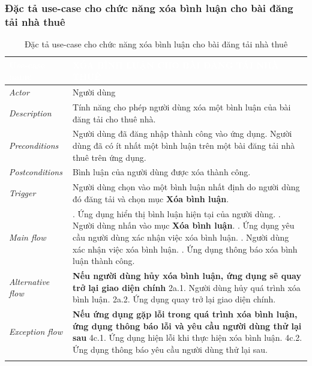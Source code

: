 \subsubsection{Đặc tả use-case cho chức năng xóa bình luận cho bài đăng tải nhà thuê}
\begin{center}
    \arrayrulewidth=2pt
    \begin{longtable}{
        |>{\raggedright\arraybackslash}p{3cm}
        |>{\raggedright\arraybackslash}p{13cm}
        |}
        \hline
        \rowcolor{cyan!75!black} \textcolor{white}{\textbf{Use-case name}} & \textcolor{white}{\textbf{XÓA BÌNH LUẬN CHO BÀI ĐĂNG TẢI NHÀ THUÊ}}
        \\\hline
        \rowcolor{cyan!10!white} \textit{Actor} & Người dùng
        \\\hdashline
        \rowcolor{cyan!10!white} \textit{Description} & Tính năng cho phép người dùng xóa một bình luận của bài đăng tải cho thuê nhà.
        \\\hdashline
        \rowcolor{cyan!10!white} \textit{Preconditions} & Người dùng đã đăng nhập thành công vào ứng dụng. Người dùng đã có ít nhất một bình luận trên một bài đăng tải nhà thuê trên ứng dụng.
        \\\hdashline
        \rowcolor{cyan!10!white} \textit{Postconditions} & Bình luận của người dùng được xóa thành công.
        \\\hdashline
        \rowcolor{cyan!10!white} \textit{Trigger} & Người dùng chọn vào một bình luận nhất định do người dùng đó đăng tải và chọn mục \textbf{Xóa bình luận}.
        \\\hdashline
        \rowcolor{cyan!10!white} \textit{Main flow} &
        1. Ứng dụng hiển thị bình luận hiện tại của người dùng. \newline
        3. Người dùng nhấn vào mục \textbf{Xóa bình luận}. \newline
        4. Ứng dụng yêu cầu người dùng xác nhận việc xóa bình luận. \newline
        5. Người dùng xác nhận việc xóa bình luận. \newline
        6. Ứng dụng thông báo xóa bình luận thành công.
        \\\hdashline
        \rowcolor{cyan!10!white} \textit{Alternative flow} & 
        \textbf{Nếu người dùng hủy xóa bình luận, ứng dụng sẽ quay trở lại giao diện chính} \newline
        2a.1. Người dùng hủy quá trình xóa bình luận. \newline
        2a.2. Ứng dụng quay trở lại giao diện chính.
        \\\hdashline
        \rowcolor{cyan!10!white} \textit{Exception flow} & 
        \textbf{Nếu ứng dụng gặp lỗi trong quá trình xóa bình luận, ứng dụng thông báo lỗi và yêu cầu người dùng thử lại sau} \newline
        4c.1. Ứng dụng hiện lỗi khi thực hiện xóa bình luận. \newline
        4c.2. Ứng dụng thông báo yêu cầu người dùng thử lại sau.
        \\\hline
        \caption{Đặc tả use-case cho chức năng xóa bình luận cho bài đăng tải nhà thuê}
    \end{longtable}
\end{center}